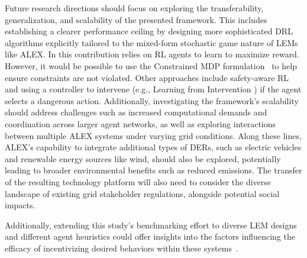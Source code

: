 \documentclass[preprint, 12pt]{elsarticle}
\begin{document}
Future research directions should focus on exploring the transferability, generalization, and scalability of the presented framework. This includes establishing a clearer performance ceiling by designing more sophisticated DRL algorithms explicitly tailored to the mixed-form stochastic game nature of LEMs like ALEX. 
In this contribution relies on RL agents to learn to maximize reward. However, it would be possible to use the Constrained MDP formulation~\cite{altman99} to help ensure constraints are not violated. Other approaches include safety-aware RL \cite{Hans08} and using a controller to intervene (e.g., Learning from Intervention \cite{DBLP:journals/corr/SaundersSSE17}) if the agent selects a dangerous action.
Additionally, investigating the framework's scalability should address challenges such as increased computational demands and coordination across larger agent networks, as well as exploring interactions between multiple ALEX systems under varying grid conditions. Along these lines, ALEX’s capability to integrate additional types of DERs, such as electric vehicles and renewable energy sources like wind, should also be explored, potentially leading to broader environmental benefits such as reduced emissions. The transfer of the resulting technology platform will also need to consider the diverse landscape of existing grid stakeholder regulations, alongside potential social impacts.

Additionally, extending this study's benchmarking effort to diverse LEM designs and different agent heuristics could offer insights into the factors influencing the efficacy of incentivizing desired behaviors within these systems~\cite{Kiedanski_LEM_Lit_Issues, Papadaskalopoulos_LEM_Lit_Issues}.






%
%
\end{document}
